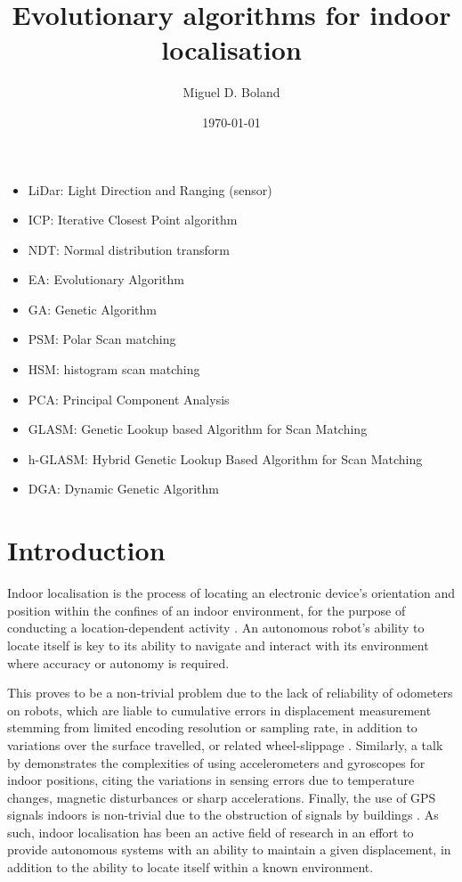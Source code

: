 \documentclass[authoryearcitations]{UoYCSproject}
\author{Miguel D. Boland}
\title{Evolutionary algorithms for indoor localisation}
\date{\today}
\begin{document}
\maketitle
\listoffigures
\listoftables
\clearpage
\lstlistoflistings
\begin{itemize}
	\item LiDar: Light Direction and Ranging (sensor)
	\item ICP: Iterative Closest Point algorithm
	\item NDT: Normal distribution transform
	\item EA: Evolutionary Algorithm
	\item GA: Genetic Algorithm
	\item PSM: Polar Scan matching
	\item HSM: histogram scan matching
	\item PCA: Principal Component Analysis
	\item GLASM: Genetic Lookup based Algorithm for Scan Matching
	\item h-GLASM: Hybrid Genetic Lookup Based Algorithm for Scan Matching
	\item DGA: Dynamic Genetic Algorithm

\end{itemize}


\chapter{Introduction}
\label{cha:Introduction}
Indoor localisation is the process of locating an electronic device's orientation and position within the confines of an indoor environment, for the purpose of conducting a location-dependent activity \cite{Curran2011-zs}. An autonomous robot's ability to locate itself is key to its ability to navigate and interact with its environment where accuracy or autonomy is required.
\newline

This proves to be a non-trivial problem due to the lack of reliability of odometers on robots, which are liable to cumulative errors in displacement measurement stemming from limited encoding resolution or sampling rate, in addition to variations over the surface travelled, or related wheel-slippage \cite{Borenstein1996-al}. Similarly, a talk by \citet{Sachs2010-pw} demonstrates the complexities of using accelerometers and gyroscopes for indoor positions, citing the variations in sensing errors due to temperature changes, magnetic disturbances or sharp accelerations. Finally, the use of GPS signals indoors is non-trivial due to the obstruction of signals by buildings \cite{Gowdayyanadoddi2015-hg}. As such, indoor localisation has been an active field of research in an effort to provide autonomous systems with an ability to maintain a given displacement, in addition to the ability to locate itself within a known environment. 
\newline
\end{document}
